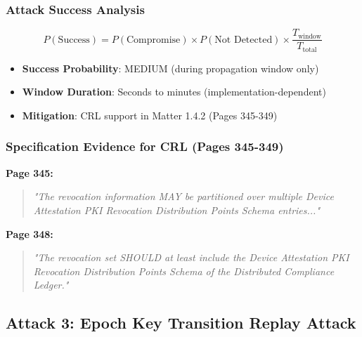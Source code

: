 \documentclass[11pt,a4paper]{article}
\begin{document}
\subsubsection{Attack Success Analysis}

\begin{equation}
    P(\text{Success}) = P(\text{Compromise}) \times P(\text{Not Detected}) \times \frac{T_{\text{window}}}{T_{\text{total}}}
\end{equation}

\begin{itemize}
    \item \textbf{Success Probability}: MEDIUM (during propagation window only)
    \item \textbf{Window Duration}: Seconds to minutes (implementation-dependent)
    \item \textbf{Mitigation}: CRL support in Matter 1.4.2 (Pages 345-349)
\end{itemize}

\subsubsection{Specification Evidence for CRL (Pages 345-349)}

\textbf{Page 345:}
\begin{quote}
    \textit{"The revocation information MAY be partitioned over multiple Device Attestation PKI Revocation Distribution Points Schema entries..."}
\end{quote}

\textbf{Page 348:}
\begin{quote}
    \textit{"The revocation set SHOULD at least include the Device Attestation PKI Revocation Distribution Points Schema of the Distributed Compliance Ledger."}
\end{quote}

\subsection{Attack 3: Epoch Key Transition Replay Attack}
\end{document}
